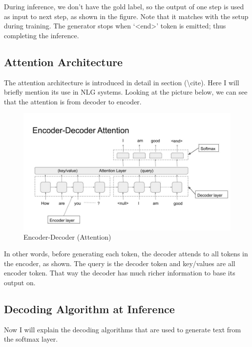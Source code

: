 \documentclass[]{krantz}
\begin{document}
During inference, we don't have the gold label, so the output of one step is used as input to next step, as shown in the figure. Note that it matches with the setup during training. The generator stops when `\textless{}end\textgreater{}' token is emitted; thus completing the inference.

\hypertarget{attention-architecture}{%
\subsection{Attention Architecture}\label{attention-architecture}}

The attention architecture is introduced in detail in section (\textbackslash{}cite). Here I will briefly mention its use in NLG systems. Looking at the picture below, we can see that the attention is from decoder to encoder.

\begin{figure}
\centering
\includegraphics{figures/04-01-use-case1/encoder_decoder_attn.jpg}
\caption{Encoder-Decoder (Attention)}
\end{figure}

In other words, before generating each token, the decoder attends to all tokens in the encoder, as shown. The query is the decoder token and key/values are all encoder token. That way the decoder has much richer information to base its output on.

\hypertarget{decoding-algorithm-at-inference}{%
\subsection{Decoding Algorithm at Inference}\label{decoding-algorithm-at-inference}}

Now I will explain the decoding algorithms that are used to generate text from the softmax layer.
\end{document}
